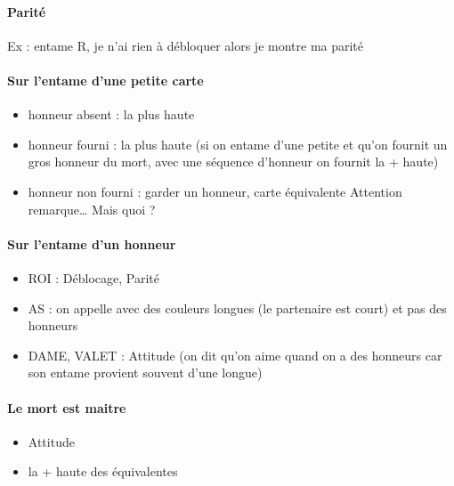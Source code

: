 \documentclass[a4paper]{article}
\begin{document}
\paragraph{Parité}

Ex : entame R, je n’ai rien à débloquer alors je montre ma parité

\paragraph{Sur l’entame d’une petite carte}

\begin{itemize}
\item honneur absent : la plus haute

\item honneur fourni : la plus haute (si on entame d’une petite et qu’on fournit un gros honneur du mort, avec une séquence d’honneur on fournit la + haute)

\item honneur non fourni : garder un honneur, carte équivalente
Attention remarque… Mais quoi ?

\end{itemize}

\paragraph{Sur l’entame d’un honneur}

\begin{itemize}
\item ROI : Déblocage, Parité

\item AS : on appelle avec des couleurs longues (le partenaire est court) et pas des honneurs

\item DAME, VALET : Attitude (on dit qu’on aime quand on a des honneurs car son entame provient souvent d’une longue)

\end{itemize}

\paragraph{Le mort est maitre}

\begin{itemize}
\item Attitude

\item la + haute des équivalentes

\end{itemize}
\end{document}
